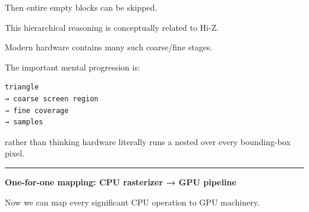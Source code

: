Then entire empty blocks can be skipped.

This hierarchical reasoning is conceptually related to Hi-Z.

Modern hardware contains many such coarse/fine stages.

The important mental progression is:

\begin{verbatim}
triangle
→ coarse screen region
→ fine coverage
→ samples
\end{verbatim}

rather than thinking hardware literally runs a nested  over every bounding-box pixel.

\begin{center}\rule{0.5\linewidth}{0.5pt}\end{center}

\textbf{One-for-one mapping: CPU rasterizer → GPU pipeline}

Now we can map every significant CPU operation to GPU machinery.

